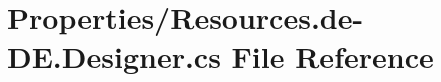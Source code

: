 \hypertarget{_resources_8de-_d_e_8_designer_8cs}{}\section{Properties/\+Resources.de-\/\+DE.Designer.\+cs File Reference}
\label{_resources_8de-_d_e_8_designer_8cs}

